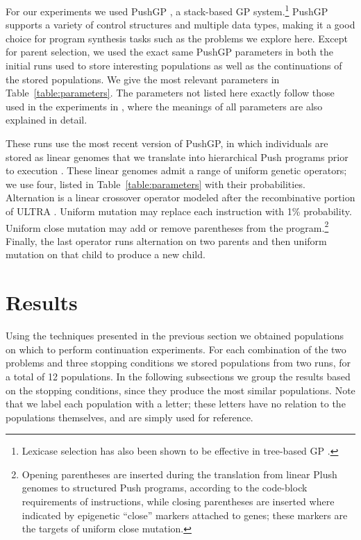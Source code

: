 \documentclass{sig-alternate-05-2015}
\begin{document}
For our experiments we used PushGP \cite{spector:2002:GPEM, 1068292}, a stack-based GP system.\footnote{Lexicase selection has also been shown to be effective in tree-based GP \cite{Helmuth:2015:ieeeTEC, Krawiec:2015:GECCO:smgpWorkshop}.} PushGP supports a variety of control structures and multiple data types, making it a good choice for program synthesis tasks such as the problems we explore here.
Except for parent selection, we used the exact same PushGP parameters in both the initial runs used to store interesting populations as well as the continuations of the stored populations. We give the most relevant parameters in Table~\ref{table:parameters}. The parameters not listed here exactly follow those used in the experiments in \cite{Helmuth:2015:dissertation}, where the meanings of all parameters are also explained in detail.

These runs use the most recent version of PushGP, in which individuals are stored as linear genomes that we translate into hierarchical Push programs prior to execution \cite{Helmuth:2015:dissertation}. These linear genomes admit a range of uniform genetic operators; we use four, listed in Table~\ref{table:parameters} with their probabilities. Alternation is a linear crossover operator modeled after the recombinative portion of ULTRA \cite{Spector:2013:GPTP}. Uniform mutation may replace each instruction with 1\% probability. Uniform close mutation may add or remove parentheses from the program.\footnote{Opening parentheses are inserted during the translation from linear Plush genomes to structured Push programs, according to the code-block requirements of instructions, while closing parentheses are inserted where indicated by epigenetic ``close'' markers attached to genes; these markers are the targets of uniform close mutation.} Finally, the last operator runs alternation on two parents and then uniform mutation on that child to produce a new child.


\section{Results}
\label{sec:results}

Using the techniques presented in the previous section we obtained populations on which to perform continuation experiments. For each combination of the two problems and three stopping conditions we stored populations from two runs, for a total of 12 populations. In the following subsections we group the results based on the stopping conditions, since they produce the most similar populations. Note that we label each population with a letter; these letters have no relation to the populations themselves, and are simply used for reference.
\end{document}
